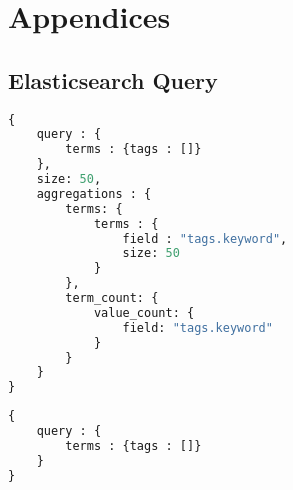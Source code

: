 \chapter{Appendices}

\section{Elasticsearch Query}
\begin{lstlisting}[language=python]
{
    query : {
        terms : {tags : []}
    },
    size: 50,
    aggregations : {
        terms: {
            terms : {
                field : "tags.keyword",
                size: 50
            }
        },
        term_count: {
            value_count: {
                field: "tags.keyword"
            }
        }
    }
}
\end{lstlisting}

\begin{lstlisting}[language=python]
{
    query : {
        terms : {tags : []}
    }
}
\end{lstlisting}
